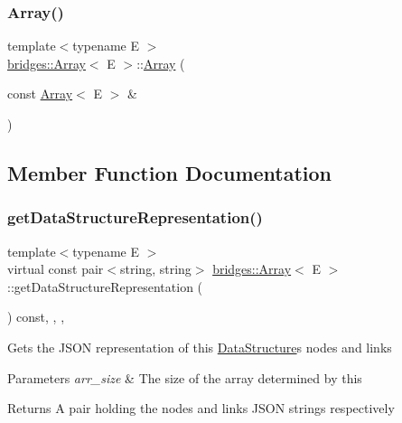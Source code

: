 \subsubsection{\texorpdfstring{Array()}{Array()}\hspace{0.1cm}{\footnotesize\ttfamily [6/6]}}
{\footnotesize\ttfamily template$<$typename E $>$ \\
\mbox{\hyperlink{classbridges_1_1_array}{bridges\+::\+Array}}$<$ E $>$\+::\mbox{\hyperlink{classbridges_1_1_array}{Array}} (\begin{DoxyParamCaption}\item[{const \mbox{\hyperlink{classbridges_1_1_array}{Array}}$<$ E $>$ \&}]{ }\end{DoxyParamCaption})\hspace{0.3cm}{\ttfamily [delete]}}



\subsection{Member Function Documentation}
\mbox{\label{classbridges_1_1_array_ab039fc0b5dd5683bbdf0fe71fce9d317}} 
\subsubsection{\texorpdfstring{get\+Data\+Structure\+Representation()}{getDataStructureRepresentation()}}
{\footnotesize\ttfamily template$<$typename E $>$ \\
virtual const pair$<$string, string$>$ \mbox{\hyperlink{classbridges_1_1_array}{bridges\+::\+Array}}$<$ E $>$\+::get\+Data\+Structure\+Representation (\begin{DoxyParamCaption}{ }\end{DoxyParamCaption}) const\hspace{0.3cm}{\ttfamily [inline]}, {\ttfamily [final]}, {\ttfamily [override]}, {\ttfamily [virtual]}}

Gets the J\+S\+ON representation of this \mbox{\hyperlink{classbridges_1_1_data_structure}{Data\+Structure}}\textquotesingle{}s nodes and links


\begin{DoxyParams}{Parameters}
{\em arr\+\_\+size} & The size of the array determined by this \\
\hline
\end{DoxyParams}
\begin{DoxyReturn}{Returns}
A pair holding the nodes and links J\+S\+ON strings respectively 
\end{DoxyReturn}


